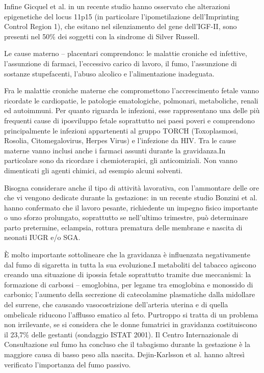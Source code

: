 Infine Gicquel et al. in un recente studio hanno osservato che alterazioni epigenetiche del locus 11p15 (in particolare l'ipometilazione dell'Imprinting Control Region 1), che esitano nel silenziamento del gene dell'IGF-II, sono presenti nel 50\% dei soggetti con la sindrome di Silver Russell\cite{gicquel2005epimutation}.


Le cause materno -- placentari comprendono: le malattie croniche ed infettive, l'assunzione di farmaci, l'eccessivo carico di lavoro, il fumo, l'assunzione di sostanze stupefacenti, l'abuso alcolico e l'alimentazione inadeguata.

Fra le malattie croniche materne che compromettono l'accrescimento fetale vanno ricordate le cardiopatie, le patologie ematologiche, polmonari, metaboliche, renali ed autoimmuni. Per quanto riguarda le infezioni, esse rappresentano una delle più frequenti cause di iposviluppo fetale soprattutto nei paesi poveri e comprendono principalmente le infezioni appartenenti al gruppo TORCH (Toxoplasmosi, Rosolia, Citomegalovirus, Herpes Virus) e l'infezione da HIV.
Tra le cause materne vanno inclusi anche i farmaci assunti durante la gravidanza.In particolare sono da ricordare i chemioterapici, gli anticomiziali. Non vanno dimenticati gli agenti chimici, ad esempio alcuni solventi.

Bisogna considerare anche il tipo di attivit\`a lavorativa, con l'ammontare delle ore
che vi vengono dedicate durante la gestazione: in un recente studio Bonzini et al. hanno confermato che il lavoro pesante, 
richiedente un impegno fisico importante o uno sforzo prolungato, soprattutto se nell'ultimo trimestre,
può determinare parto pretermine, eclampsia, rottura prematura delle membrane e nascita di neonati IUGR e/o SGA\cite{sga-14}.

\`E molto importante sottolineare che la gravidanza è influenzata negativamente dal fumo di sigaretta in tutta la sua evoluzione.I metaboliti del tabacco agiscono creando
una situazione di ipossia fetale soprattutto tramite due meccanismi: la formazione di carbossi -- emoglobina, 
per legame tra emoglobina e monossido di carbonio; l'aumento della secrezione di catecolamine plasmatiche
dalla midollare del surrene, che causando vasocostrizione dell'arteria uterina e di quella ombelicale riducono l'afflusso ematico al feto.
Purtroppo si tratta di un problema non irrilevante, se si considera che le donne fumatrici in gravidanza costituiscono il 23,7\% delle gestanti (sondaggio ISTAT 2001).
Il Centro Internazionale di Consultazione sul fumo ha concluso che il tabagismo durante la gestazione \`e la maggiore causa di basso peso alla nascita\cite{sga-18}.
Dejin-Karlsson et al. hanno altres\`i verificato l'importanza del fumo passivo\cite{sga-20}. 

